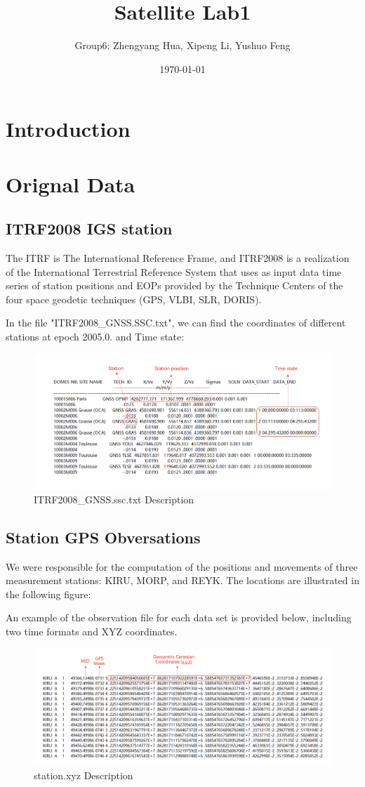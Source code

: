 \documentclass{article}
\title{Satellite Lab1}
\author{Group6: Zhengyang Hua, Xipeng Li, Yushuo Feng}
\date{\today}
\begin{document}
\maketitle

\section{Introduction}


\section{Orignal Data}
\subsection{ITRF2008 IGS station}
The ITRF is The International Reference Frame,  
and ITRF2008 is a realization of the International Terrestrial Reference System 
that uses as input data time series of station positions and EOPs provided by the Technique Centers of the four space geodetic techniques (GPS, VLBI, SLR, DORIS).

In the file "ITRF2008\_GNSS.SSC.txt", we can find the coordinates of different stations at epoch 2005.0.
 and Time state:
\begin{figure}[htbp]
    \centering
    \includegraphics[width=12cm]{./source/ITRF2008.png}
    \caption{ITRF2008\_GNSS.ssc.txt Description}
    \label{fig:ITRF2008}
\end{figure}
\subsection{Station GPS Obversations}
We were responsible for the computation of the positions and movements of three measurement stations: KIRU, MORP, and REYK. The locations are illustrated in the following figure:

An example of the observation file for each data set is provided below, including two time formats and XYZ coordinates.
\begin{figure}[htbp]
    \centering
    \includegraphics[width=12cm]{./source/xyz.png}
    \caption{station.xyz Description}
    \label{fig:XYZ_obs}
\end{figure}
\end{document}
